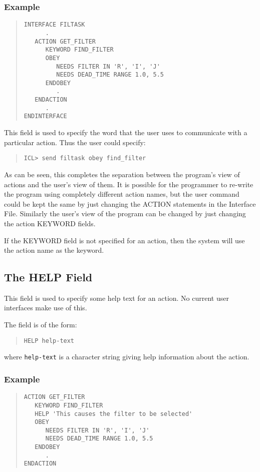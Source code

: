 \documentclass[twoside,11pt]{article}
\newcommand{\xlabel}[1]{}
\renewcommand{\_}{\texttt{\symbol{95}}}
\begin{document}
\subsubsection*{Example}
\begin{quote} \begin{verbatim}
INTERFACE FILTASK
      .
   ACTION GET_FILTER
      KEYWORD FIND_FILTER
      OBEY
         NEEDS FILTER IN 'R', 'I', 'J'
         NEEDS DEAD_TIME RANGE 1.0, 5.5
      ENDOBEY
         .
   ENDACTION
      .
ENDINTERFACE
\end{verbatim} \end{quote}
This field is used to specify the word that the user uses to communicate 
with a particular action. Thus the user could specify:
\begin{quote} \begin{verbatim}
ICL> send filtask obey find_filter
\end{verbatim} \end{quote}
As can be seen, this completes the separation between the program's
view of actions and the user's view of them. It is possible for the
programmer to re-write the program using completely different action
names, but the user command could be kept the same by just changing the 
ACTION statements in the Interface File. Similarly the
user's view of the program can be changed by just changing the
action KEYWORD fields. 

If the KEYWORD field is not specified for an action, then the system will
use the action name as the keyword.

\subsection{The HELP Field\xlabel{the_help_field}}

This field is used to specify some help text for an action. No current 
user interfaces make use of this.

The field is of the form:
\begin{quote} \begin{verbatim}
HELP help-text
\end{verbatim} \end{quote}
where \texttt{help-text} is a character string giving help information about the
action.
\subsubsection*{Example}
\begin{quote} \begin{verbatim}
ACTION GET_FILTER
   KEYWORD FIND_FILTER
   HELP 'This causes the filter to be selected'
   OBEY
      NEEDS FILTER IN 'R', 'I', 'J'
      NEEDS DEAD_TIME RANGE 1.0, 5.5
   ENDOBEY
      .
ENDACTION
\end{verbatim} \end{quote}
\end{document}
